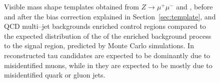 \begin{figure}
\begin{center}
\caption[Comparison of background shapes in the signal and control
regions]{\captiontext Visible mass shape templates obtained from $Z \to
\mu^{+} \mu^{-}$  and
, \WpJets before 
and after  the bias
correction explained in Section~\ref{sec:template}, \ttbarpJets
{} and
QCD multi--jet  backgrounds enriched control regions compared to the expected
distribution of the of the enriched background process to the signal region,
predicted by Monte Carlo simulations.  In  reconstructed tau candidates
are expected to be dominantly due to misidentified muons, while in
 they are
expected to be mostly due to misidentified quark or gluon jets.}
\label{fig:VisMassTemplates}
\end{center}
\end{figure} 

